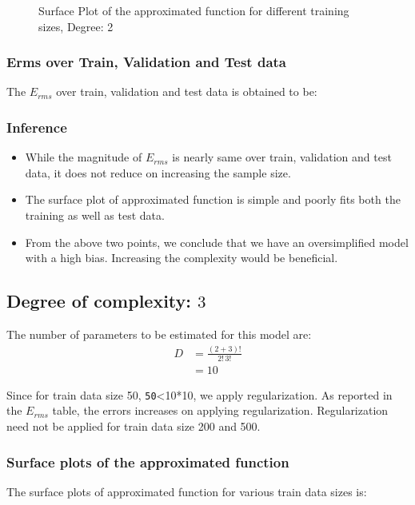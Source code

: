 \documentclass[12pt,a4paper]{article}
\newcommand{\noi}{\noindent}
\def\tt#1{\texttt{#1}}
\begin{document}
\begin{figure}[H]
    \caption{Surface Plot of the approximated function for different training sizes, Degree: 2}
    \label{fig:sp_d2}
\end{figure}

\subsubsection{Erms over Train, Validation and Test data}
The $E_{rms}$ over train, validation and test data is obtained to be: 


\subsubsection{Inference}
\begin{itemize}
    \itemsep0em
    \item While the magnitude of $E_{rms}$ is nearly same over train, validation and test data, it does not reduce on increasing the sample size. 
    \item The surface plot of approximated function is simple and poorly fits both the training as well as test data.
    \item From the above two points, we conclude that we have an oversimplified model with a high bias. Increasing the complexity would be beneficial.
\end{itemize}

\subsection{Degree of complexity: $3$}
The number of parameters to be estimated for this model are: 
\begin{equation}
    \begin{split}
        D&=\frac{(2+3)!}{2!\,3!} \\
         &=10
    \end{split}
\end{equation}

\noi
Since for train data size 50, \tt{50}<10*10, we apply regularization. As reported in the $E_{rms}$ table, the errors increases on applying regularization. Regularization need not be applied for train data size 200 and 500. 

\subsubsection{Surface plots of the approximated function}
The surface plots of approximated function for various train data sizes is: 
\end{document}
